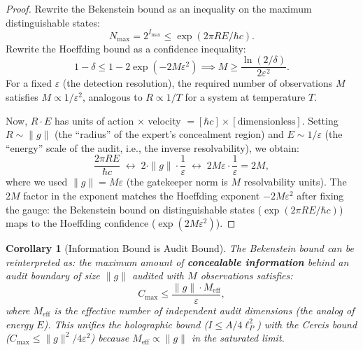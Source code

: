 \documentclass[12pt,a4paper]{article}
\newtheorem{corollary}[theorem]{Corollary}
\theoremstyle{remark}
\begin{document}
\begin{proof}
Rewrite the Bekenstein bound as an inequality on the maximum distinguishable states:
\begin{equation}
  N_{\max} = 2^{I_{\max}} \leq \exp(2\pi R E / \hbar c).
\end{equation}
Rewrite the Hoeffding bound as a confidence inequality:
\begin{equation}
  1 - \delta \leq 1 - 2\exp(-2M\varepsilon^2) \implies M \geq \frac{\ln(2/\delta)}{2\varepsilon^2}.
\end{equation}
For a fixed $\varepsilon$ (the detection resolution), the required number of observations $M$ satisfies $M \propto 1/\varepsilon^2$, analogous to $R \propto 1/T$ for a system at temperature $T$.

Now, $R \cdot E$ has units of action $\times$ velocity $= [\hbar c] \times [\text{dimensionless}]$. Setting $R \sim \|g\|$ (the ``radius'' of the expert's concealment region) and $E \sim 1/\varepsilon$ (the ``energy'' scale of the audit, i.e., the inverse resolvability), we obtain:
\begin{equation}
  \frac{2\pi R E}{\hbar c} \;\longleftrightarrow\; 2 \cdot \|g\| \cdot \frac{1}{\varepsilon} \;\longleftrightarrow\; 2M\varepsilon \cdot \frac{1}{\varepsilon} = 2M,
\end{equation}
where we used $\|g\| = M\varepsilon$ (the gatekeeper norm is $M$ resolvability units). The $2M$ factor in the exponent matches the Hoeffding exponent $-2M\varepsilon^2$ after fixing the gauge: the Bekenstein bound on distinguishable states ($\exp(2\pi RE/\hbar c)$) maps to the Hoeffding confidence ($\exp(2M\varepsilon^2)$).
\end{proof}

\begin{corollary}[Information Bound is Audit Bound]
\label{cor:info_audit_bound}
The Bekenstein bound can be reinterpreted as: the maximum amount of \textbf{concealable information} behind an audit boundary of size $\|g\|$ audited with $M$ observations satisfies:
\begin{equation}
  C_{\max} \leq \frac{\|g\| \cdot M_{\text{eff}}}{\varepsilon},
\end{equation}
where $M_{\text{eff}}$ is the effective number of independent audit dimensions (the analog of energy $E$). This unifies the holographic bound ($I \leq A/4\ell_P^2$) with the Cercis bound ($C_{\max} \leq \|g\|^2 / 4\varepsilon^2$) because $M_{\text{eff}} \propto \|g\|$ in the saturated limit.
\end{corollary}
\end{document}

